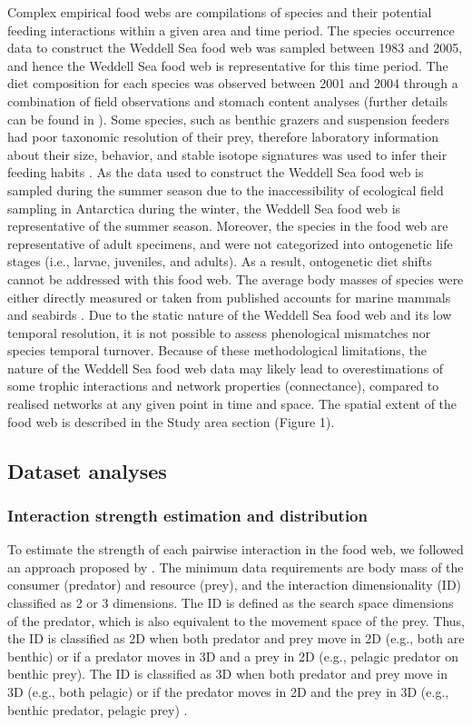 \documentclass[gc, manuscript]{copernicus}
\begin{document}
Complex empirical food webs are compilations of species and their
potential feeding interactions within a given area and time period. The
species occurrence data to construct the Weddell Sea food web was
sampled between 1983 and 2005, and hence the Weddell Sea food web is
representative for this time period. The diet composition for each
species was observed between 2001 and 2004 through a combination of
field observations and stomach content analyses (further details can be
found in \citet{Jacob2005}). Some species, such as benthic grazers and
suspension feeders had poor taxonomic resolution of their prey,
therefore laboratory information about their size, behavior, and stable
isotope signatures was used to infer their feeding habits
\citep{Jacob2011}. As the data used to construct the Weddell Sea food
web is sampled during the summer season due to the inaccessibility of
ecological field sampling in Antarctica during the winter, the Weddell
Sea food web is representative of the summer season. Moreover, the
species in the food web are representative of adult specimens, and were
not categorized into ontogenetic life stages (i.e., larvae, juveniles,
and adults). As a result, ontogenetic diet shifts cannot be addressed
with this food web. The average body masses of species were either
directly measured \citep{Jacob2005} or taken from published accounts for
marine mammals and seabirds \citep{Brose2006a}. Due to the static nature
of the Weddell Sea food web and its low temporal resolution, it is not
possible to assess phenological mismatches nor species temporal
turnover. Because of these methodological limitations, the nature of the
Weddell Sea food web data may likely lead to overestimations of some
trophic interactions and network properties (connectance), compared to
realised networks at any given point in time and space. The spatial
extent of the food web is described in the Study area section (Figure
1).

\subsection{Dataset analyses}

\subsubsection{Interaction strength estimation and distribution}

To estimate the strength of each pairwise interaction in the food web,
we followed an approach proposed by \citet{Pawar2012}. The minimum data
requirements are body mass of the consumer (predator) and resource
(prey), and the interaction dimensionality (ID) classified as 2 or 3
dimensions. The ID is defined as the search space dimensions of the
predator, which is also equivalent to the movement space of the prey.
Thus, the ID is classified as 2D when both predator and prey move in 2D
(e.g., both are benthic) or if a predator moves in 3D and a prey in 2D
(e.g., pelagic predator on benthic prey). The ID is classified as 3D
when both predator and prey move in 3D (e.g., both pelagic) or if the
predator moves in 2D and the prey in 3D (e.g., benthic predator, pelagic
prey) \citep{Pawar2012}.
\end{document}
